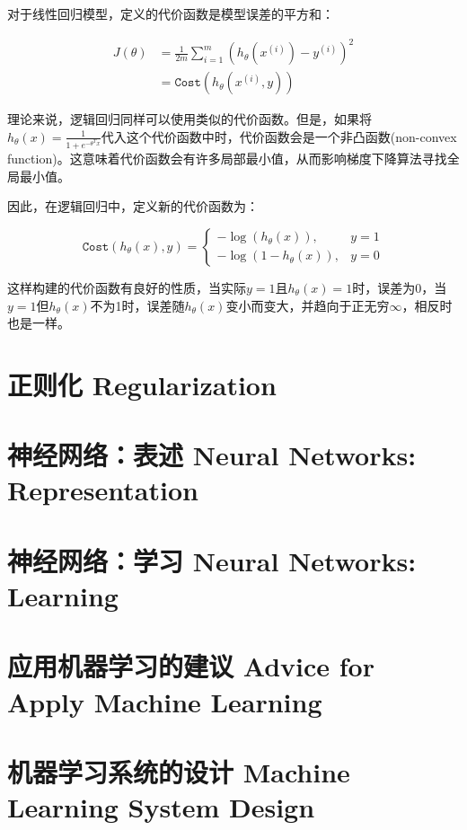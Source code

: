 \documentclass[12pt, a4paper]{article}
\begin{document}
对于线性回归模型，定义的代价函数是模型误差的平方和：

\begin{align*}
    J(\theta) & = \frac{1}{2m}\sum_{i=1}^{m}(h_\theta(x^{(i)})-y^{(i)})^2 \\
    & = \mathtt{Cost}(h_\theta(x^{(i)}, y))
\end{align*}

理论来说，逻辑回归同样可以使用类似的代价函数。但是，如果将$h_\theta(x)=\frac{1}{1+e^{-\theta^Tx}}$代入这个代价函数中时，代价函数会是一个非凸函数(non-convex function)。这意味着代价函数会有许多局部最小值，从而影响梯度下降算法寻找全局最小值。

因此，在逻辑回归中，定义新的代价函数为：

\begin{equation*}
    \mathtt{Cost}(h_\theta(x), y) = 
    \begin{cases}
        -\log(h_\theta(x)), & y = 1\\
        -\log(1-h_\theta(x)), & y = 0
    \end{cases}
\end{equation*}

这样构建的代价函数有良好的性质，当实际$y=1$且$h_\theta(x)=1$时，误差为0，当$y=1$但$h_\theta(x)$不为1时，误差随$h_\theta(x)$变小而变大，并趋向于正无穷$\infty$，相反时也是一样。

\section{正则化 Regularization}

\section{神经网络：表述 Neural Networks: Representation}

\section{神经网络：学习 Neural Networks: Learning}

\section{应用机器学习的建议 Advice for Apply Machine Learning}

\section{机器学习系统的设计 Machine Learning System Design}
\end{document}
